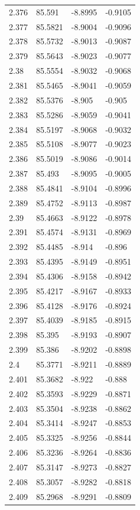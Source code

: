 \begin{tabular}{llll}
2.376 & 85.591 & -8.8995 & -0.9105 \\
2.377 & 85.5821 & -8.9004 & -0.9096 \\
2.378 & 85.5732 & -8.9013 & -0.9087 \\
2.379 & 85.5643 & -8.9023 & -0.9077 \\
2.38 & 85.5554 & -8.9032 & -0.9068 \\
2.381 & 85.5465 & -8.9041 & -0.9059 \\
2.382 & 85.5376 & -8.905 & -0.905 \\
2.383 & 85.5286 & -8.9059 & -0.9041 \\
2.384 & 85.5197 & -8.9068 & -0.9032 \\
2.385 & 85.5108 & -8.9077 & -0.9023 \\
2.386 & 85.5019 & -8.9086 & -0.9014 \\
2.387 & 85.493 & -8.9095 & -0.9005 \\
2.388 & 85.4841 & -8.9104 & -0.8996 \\
2.389 & 85.4752 & -8.9113 & -0.8987 \\
2.39 & 85.4663 & -8.9122 & -0.8978 \\
2.391 & 85.4574 & -8.9131 & -0.8969 \\
2.392 & 85.4485 & -8.914 & -0.896 \\
2.393 & 85.4395 & -8.9149 & -0.8951 \\
2.394 & 85.4306 & -8.9158 & -0.8942 \\
2.395 & 85.4217 & -8.9167 & -0.8933 \\
2.396 & 85.4128 & -8.9176 & -0.8924 \\
2.397 & 85.4039 & -8.9185 & -0.8915 \\
2.398 & 85.395 & -8.9193 & -0.8907 \\
2.399 & 85.386 & -8.9202 & -0.8898 \\
2.4 & 85.3771 & -8.9211 & -0.8889 \\
2.401 & 85.3682 & -8.922 & -0.888 \\
2.402 & 85.3593 & -8.9229 & -0.8871 \\
2.403 & 85.3504 & -8.9238 & -0.8862 \\
2.404 & 85.3414 & -8.9247 & -0.8853 \\
2.405 & 85.3325 & -8.9256 & -0.8844 \\
2.406 & 85.3236 & -8.9264 & -0.8836 \\
2.407 & 85.3147 & -8.9273 & -0.8827 \\
2.408 & 85.3057 & -8.9282 & -0.8818 \\
2.409 & 85.2968 & -8.9291 & -0.8809 \\

\end{tabular}
